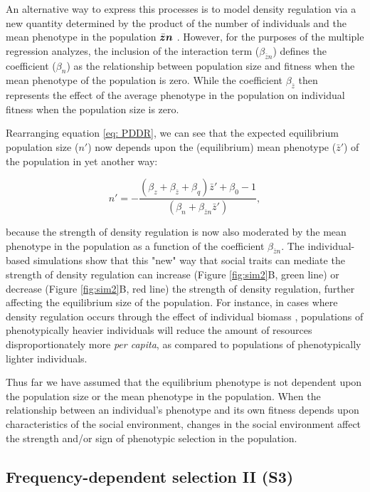 \documentclass{article}
\begin{document}
An alternative way to express this processes  is to model density regulation via a new quantity determined by the product of the number of individuals and the mean phenotype in the population $\bar{\vectorsym{z}}\vectorsym{n}$ \citep{Engen2020}. However, for the purposes of the multiple regression analyzes, the inclusion of the interaction term ($\beta_{\bar{z}n}$) defines the coefficient ($\beta_{n}$) as the relationship between population size and fitness when the mean phenotype of the population is zero. While the coefficient $ \beta_{\bar{z}}$ then represents the effect of the average phenotype in the population on individual fitness when the population size is zero. 

Rearranging equation \ref{eq: PDDR}, we can see that the expected equilibrium population size ($n'$) now depends upon the (equilibrium) mean phenotype ($\bar{z}'$) of the population in yet another way:

\begin{equation}
n' = -\frac{(\beta_{z}  + \beta_{\bar{z}} + \beta_{q})\bar{z}'+\beta_{0} -1}{(\beta_{n} +  \beta_{\bar{z}n} \bar{z}')},
\end{equation}

\noindent because the strength of density regulation is now also moderated by the mean phenotype in the population as a function of the coefficient  $\beta_{\bar{z}n}$. The individual-based simulations show that this "new" way that social traits can mediate the strength of density regulation can increase (Figure \ref{fig:sim2}B, green line) or decrease (Figure \ref{fig:sim2}B, red line) the strength of density regulation, further affecting the equilibrium size of the population. For instance, in cases where density regulation occurs through the effect of individual biomass \citep{Owen-Smith2002}, populations of phenotypically heavier individuals will reduce the amount of resources disproportionately more \textit{per capita}, as compared to populations of phenotypically lighter individuals.

Thus far we have assumed that the equilibrium phenotype is not dependent upon the population size or the mean phenotype in the population. When the relationship between an individual's phenotype and its own fitness depends upon characteristics of the social environment, changes in the social environment affect the strength and/or sign of phenotypic selection in the population. 
 
 
\subsection{Frequency-dependent selection II (S3)}
\end{document}
